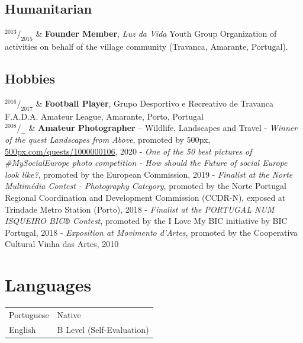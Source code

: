 \documentclass[10pt,a4paper]{article}
\newcommand{\TablePad}{\vspace{-0.4cm}}
\newcommand{\Duration}[2]{\fontsize{10pt}{0}\selectfont $^{#1}/_{#2}$}
\newcommand{\Ongoing}{-}
\begin{document}
\subsection*{Humanitarian}

\begin{EntriesTable}
\Duration{2013}{2015} &
    \textbf{Founder Member}, \emph{Luz da Vida} Youth Group
    \newline
    Organization of activities on behalf of the village community (Travanca, Amarante, Portugal).
\end{EntriesTable}

\subsection*{Hobbies}

\begin{EntriesTable}
\Duration{2016}{2017} &
    \textbf{Football Player}, Grupo Desportivo e Recreativo de Travanca 
    \newline
    F.A.D.A. Amateur League, Amarante, \small{Porto, Portugal}
    \\
\Duration{2008}{\Ongoing} &
    \textbf{Amateur Photographer} -- Wildlife, Landscapes and Travel
    \newline
    - \textit{Winner of the quest \textit{Landscapes from Above}}, promoted by 500px, \href{https://web.500px.com/quests/1000000106/landscapes-from-above}{500px.com/quests/1000000106}, 2020
    \newline
    - \textit{One of the 50 best pictures of \#MySocialEurope photo competition - How should the Future of social Europe look like?}, promoted by the European Commission, 2019
    \newline
    - \textit{Finalist at the Norte Multimédia Contest - Photography Category}, promoted by the Norte Portugal Regional Coordination and Development Commission (CCDR-N), exposed at Trindade Metro Station (Porto), 2018
    \newline
    - \textit{Finalist at the PORTUGAL NUM ISQUEIRO BIC® Contest}, promoted by the I Love My BIC initiative by BIC Portugal, 2018
    \newline
    - \textit{Exposition at Movimento d'Artes}, promoted by the Cooperativa Cultural Vinha das Artes, 2010
\end{EntriesTable}


\section*{ Languages}

\TablePad
\begin{tabularx}{\textwidth}{@{}p{} p{}@{}}
    Portuguese & Native
    \\
    English & B Level (Self-Evaluation)
\end{tabularx}

\end{document}
